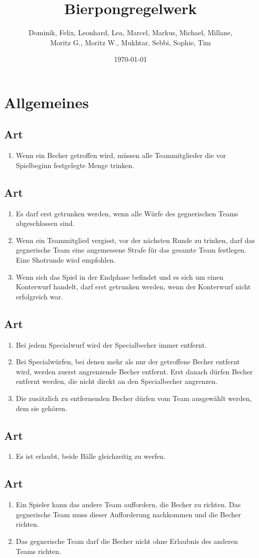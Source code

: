 \documentclass[a4paper,11pt]{scrartcl}
\title{\Huge{Bierpongregelwerk}}
\author{Dominik, Felix, Leonhard, Lea, Marcel, Markus, Michael, Millane, \\Moritz G., Moritz W., Mukhtar, Sebbi, Sophie, Tim}
\date{\small{\today}}
\newcommand{\enum}[1]{\begin{enumerate}[label=(\arabic*)]#1\end{enumerate}}
\newcommand{\art}[2]{\subsection*{#1} \enum{#2}}
\newcounter{art}
\begin{document}
 
\maketitle
\vspace*{-1cm}
\newpage

\section{Allgemeines}
    \art{Art \theart}{
        \item
            Wenn ein Becher getroffen wird, müssen alle Teammitglieder die vor Spielbeginn festgelegte Menge trinken.
    }

    \art{Art \theart}{
        \item
            Es darf erst getrunken werden, wenn alle Würfe des gegnerischen Teams abgeschlossen sind.
        \item
            Wenn ein Teammitglied vergisst, vor der nächsten Runde zu trinken, darf das gegnerische Team eine angemessene Strafe für das gesamte Team festlegen. Eine Shotrunde wird empfohlen.
        \item
            Wenn sich das Spiel in der Endphase befindet und es sich um einen Konterwurf handelt, darf erst getrunken werden, wenn der Konterwurf nicht erfolgreich war.
    }

    \art{Art \theart}{
        \item
            Bei jedem Specialwurf wird der Specialbecher immer entfernt.
        \item
            Bei Specialwürfen, bei denen mehr als nur der getroffene Becher entfernt wird, werden zuerst angrenzende Becher entfernt. Erst danach dürfen Becher entfernt werden, die nicht direkt an den Specialbecher angrenzen.
        \item
            Die zusätzlich zu entfernenden Becher dürfen vom Team ausgewählt werden, dem sie gehören.
    }

    \art{Art \theart}{
        \item
            Es ist erlaubt, beide Bälle gleichzeitig zu werfen.
    }

    \art{Art \theart}{
        \item
            Ein Spieler kann das andere Team auffordern, die Becher zu richten. Das gegnerische Team muss dieser Aufforderung nachkommen und die Becher richten.
        \item
            Das gegnerische Team darf die Becher nicht ohne Erlaubnis des anderen Teams richten.
    }
\end{document}
